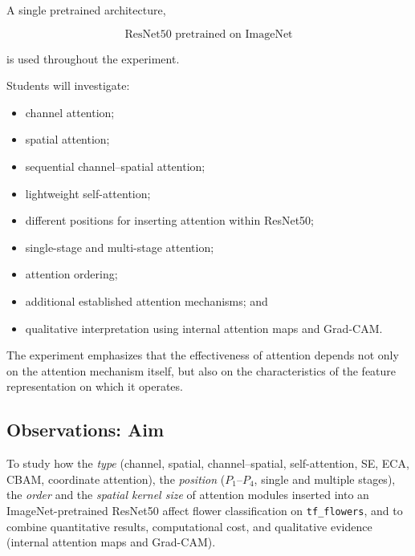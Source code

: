 \documentclass[10pt]{article}
\begin{document}
A single pretrained architecture,

\[
\boxed{\text{ResNet50 pretrained on ImageNet}}
\]

is used throughout the experiment.

Students will investigate:

\begin{itemize}

\item channel attention;

\item spatial attention;

\item sequential channel--spatial attention;

\item lightweight self-attention;

\item different positions for inserting attention within ResNet50;

\item single-stage and multi-stage attention;

\item attention ordering;

\item additional established attention mechanisms; and

\item qualitative interpretation using internal attention maps and Grad-CAM.

\end{itemize}

The experiment emphasizes that the effectiveness of attention depends not
only on the attention mechanism itself, but also on the characteristics of
the feature representation on which it operates.


\medskip
{}

\subsection*{Observations: Aim}
To study how the \emph{type} (channel, spatial, channel--spatial, self-attention, SE, ECA, CBAM, coordinate attention), the \emph{position} ($P_1$--$P_4$, single and multiple stages), the \emph{order} and the \emph{spatial kernel size} of attention modules inserted into an ImageNet-pretrained ResNet50 affect flower classification on \texttt{tf\_flowers}, and to combine quantitative results, computational cost, and qualitative evidence (internal attention maps and Grad-CAM).
\end{document}
